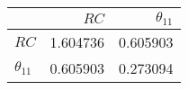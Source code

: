 \begin{table}
\centering
\label{cov}
\begin{tabular}{lrr}
\toprule
{} &      $RC$ &  $\theta_{11}$ \\
\midrule
$RC$          &  1.604736 &       0.605903 \\
$\theta_{11}$ &  0.605903 &       0.273094 \\
\bottomrule
\end{tabular}
\end{table}
